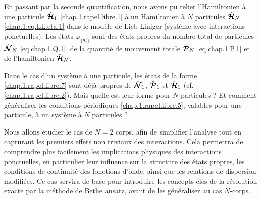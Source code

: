\medskip

En passant par la seconde quantification, nous avons pu relier l’Hamiltonien à une particule $\hat{\bm{\mathcal{H}}}_1$ \eqref{chap.1.rapel.libre.1} à un Hamiltonien à $N$ particules $\hat{\bm{\mathcal{H}}}_N$ \eqref{chap.1:eq.LL.eta.1} dans le modèle de Lieb-Liniger (système avec interactions ponctuelles). Les états $\varphi_{\{ \theta_a \}}$ sont des états propres du nombre total de particules $\hat{\bm{\mathcal{N}}}_N$ \eqref{eq.chap.1.Q.1}, de la quantité de mouvement totale $\hat{\bm{\mathcal{P}}}_N$ \eqref{eq.chap.1.P.1} et de l’hamiltonien $\hat{\bm{\mathcal{H}}}_N$.

\medskip

Dans le cas d’un système à une particule, les états de la forme \eqref{chap.1.rapel.libre.7} sont déjà propres de $\hat{\bm{\mathcal{N}}}_1$, $\hat{\bm{\mathcal{P}}}_1$ et $\hat{\bm{\mathcal{H}}}_1$ (cf. \eqref{chap.1.rapel.libre.2}). Mais quelle est leur forme pour $N$ particules ? Et comment généraliser les conditions périodiques \eqref{chap.1.rapel.libre.5}, valables pour une particule, à un système à $N$ particules ?\\

\medskip

Nous allons étudier le cas de $N=2$ corps, afin de simplifier l’analyse tout en capturant les premiers effets non triviaux des interactions. Cela permettra de comprendre plus facilement les implications physiques des interactions ponctuelles, en particulier leur influence sur la structure des états propres, les conditions de continuité des fonctions d’onde, ainsi que les relations de dispersion modifiées. Ce cas servira de base pour introduire les concepts clés de la résolution exacte par la méthode de Bethe ansatz, avant de les généraliser au cas $N$-corps.

 




